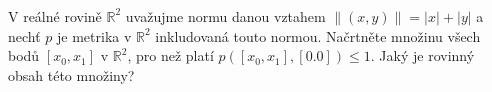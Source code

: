 \subsubsection{}
V reálné rovině $\mathbb{R}^{2}$ uvažujme normu danou vztahem $\left \| (x,y)
\right \|=\left | x \right |+\left | y \right |$ a nechť $p$ je metrika v
$\mathbb{R}^{2}$ inkludovaná touto normou. Načrtněte množinu všech bodů $\left [
x_{0},x_{1} \right ]$ v $\mathbb{R}^{2}$, pro než platí $p(\left [ x_{0},x_{1}
\right ],\left [ 0.0 \right ])\leq 1$. Jaký je rovinný obsah této množiny?
